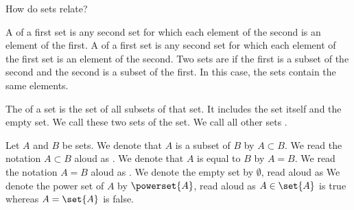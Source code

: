 
\sbasic



\sstart



How do sets relate?


A
of a first set is any second set for
which each element of the second
is an element of the first.
A
of a first set is any second set
for which each element of the
first set is an element of the second.
Two sets are
 if the first is a
subset of the second and the
second is a subset of the first.
In this case, the sets contain
the same elements.

The
of a set is the set of all subsets of that
set.
It includes the set itself and the empty set.
We call these two sets
of the set.
We call all other sets
.


Let $A$ and $B$ be sets.
We denote that $A$ is a subset of $B$ by $A \subset B$.
We read the notation $A \subset B$ aloud as .
We denote that $A$ is equal to $B$ by $A = B$.
We read the notation $A = B$ aloud as .
We denote the empty set by $\emptyset$, read aloud as 
We denote the power set of $A$ by $\powerset{A}$, read aloud as 
$A \in \set{A}$ is true whereas $A = \set{A}$ is false.

\strats
